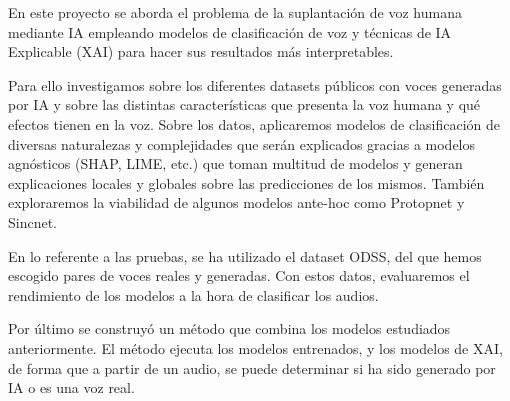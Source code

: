 \documentclass[tfg,estilo=digital,portada=normativa]{fdi-simplex}
\begin{document}
\makeportada

\frontmatter

\begin{resumen}
En este proyecto se aborda el problema de la suplantación de voz humana mediante IA empleando modelos de clasificación de voz y técnicas de IA Explicable (XAI) para hacer sus resultados más interpretables.

Para ello investigamos sobre los diferentes datasets públicos con voces generadas por IA y sobre las distintas características que presenta la voz humana y qué efectos tienen en la voz. Sobre los datos, aplicaremos modelos de clasificación de diversas naturalezas y complejidades que serán explicados gracias a modelos agnósticos (SHAP, LIME, etc.) que toman multitud de modelos y generan explicaciones locales y globales sobre las predicciones de los mismos. También exploraremos la viabilidad de algunos modelos ante-hoc como Protopnet y Sincnet.

En lo referente a las pruebas, se ha utilizado el dataset ODSS, del que hemos escogido pares de voces reales y generadas. Con estos datos, evaluaremos el rendimiento de los modelos a la hora de clasificar los audios.

Por último se construyó un método que combina los modelos estudiados anteriormente. El método ejecuta los modelos entrenados, y los modelos de XAI, de forma que a partir de un audio, se puede determinar si ha sido generado por IA o es una voz real.

    
\end{resumen}

\begin{abstract}
This project addresses the problem of AI-based human voice spoofing by employing voice classification models and eXplainable AI (XAI) techniques to make its results more interpretable.

To do this, we researched different public datasets containing AI-generated voices, as well as the various characteristics of human voice and the effects they have on voice production. Regarding the data, we will apply classification models of different natures and complexities, which will be explained using agnostic models (SHAP, LIME, etc.) that can many models and generate local and global explanations for their predictions. We will also explore the feasibility of some ante-hoc models such as Protopnet and Sincnet.

Regarding the tests, the dataset ODSS was used, from which we have picked real and spoofed voices in pairs. With this data we will assess the performance of the models in classifying audios.

Finally, a pipeline that combines the models previously studied was built. This pipeline executes the pre-trained models, as well as the XAI models, in order to determine whether an audio is AI-generated or it is a real human voice.

\end{abstract}
\end{document}
